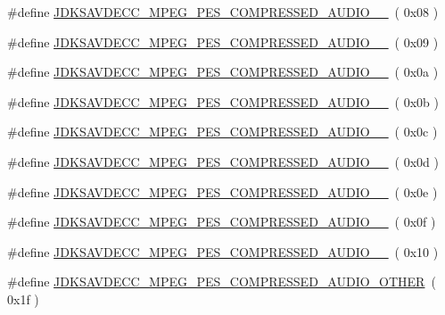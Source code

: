 \begin{DoxyCompactItemize}
\#define \hyperlink{group__mpeg__pes__compressed__audio_ga9ea440a7718daa36283639e4b9ae93af}{J\+D\+K\+S\+A\+V\+D\+E\+C\+C\+\_\+\+M\+P\+E\+G\+\_\+\+P\+E\+S\+\_\+\+C\+O\+M\+P\+R\+E\+S\+S\+E\+D\+\_\+\+A\+U\+D\+I\+O\+\_\+\_}~( 0x08 )
\item 
\#define \hyperlink{group__mpeg__pes__compressed__audio_ga388208460b496b5a3fa43601aa4a8618}{J\+D\+K\+S\+A\+V\+D\+E\+C\+C\+\_\+\+M\+P\+E\+G\+\_\+\+P\+E\+S\+\_\+\+C\+O\+M\+P\+R\+E\+S\+S\+E\+D\+\_\+\+A\+U\+D\+I\+O\+\_\+\_}~( 0x09 )
\item 
\#define \hyperlink{group__mpeg__pes__compressed__audio_gad3820f10b2d8d7f8e5d7dba7554591eb}{J\+D\+K\+S\+A\+V\+D\+E\+C\+C\+\_\+\+M\+P\+E\+G\+\_\+\+P\+E\+S\+\_\+\+C\+O\+M\+P\+R\+E\+S\+S\+E\+D\+\_\+\+A\+U\+D\+I\+O\+\_\+\_}~( 0x0a )
\item 
\#define \hyperlink{group__mpeg__pes__compressed__audio_ga44f00a2f1e250ffd167c1c54ede37b9c}{J\+D\+K\+S\+A\+V\+D\+E\+C\+C\+\_\+\+M\+P\+E\+G\+\_\+\+P\+E\+S\+\_\+\+C\+O\+M\+P\+R\+E\+S\+S\+E\+D\+\_\+\+A\+U\+D\+I\+O\+\_\+\_}~( 0x0b )
\item 
\#define \hyperlink{group__mpeg__pes__compressed__audio_ga2d11fb9ae7325866b482ddae46c01f6c}{J\+D\+K\+S\+A\+V\+D\+E\+C\+C\+\_\+\+M\+P\+E\+G\+\_\+\+P\+E\+S\+\_\+\+C\+O\+M\+P\+R\+E\+S\+S\+E\+D\+\_\+\+A\+U\+D\+I\+O\+\_\+\_}~( 0x0c )
\item 
\#define \hyperlink{group__mpeg__pes__compressed__audio_ga378eb21c914ca30bed9ed15b919e2db7}{J\+D\+K\+S\+A\+V\+D\+E\+C\+C\+\_\+\+M\+P\+E\+G\+\_\+\+P\+E\+S\+\_\+\+C\+O\+M\+P\+R\+E\+S\+S\+E\+D\+\_\+\+A\+U\+D\+I\+O\+\_\+\_}~( 0x0d )
\item 
\#define \hyperlink{group__mpeg__pes__compressed__audio_gad5046aba52c6b517a355dacb11175fd1}{J\+D\+K\+S\+A\+V\+D\+E\+C\+C\+\_\+\+M\+P\+E\+G\+\_\+\+P\+E\+S\+\_\+\+C\+O\+M\+P\+R\+E\+S\+S\+E\+D\+\_\+\+A\+U\+D\+I\+O\+\_\+\_}~( 0x0e )
\item 
\#define \hyperlink{group__mpeg__pes__compressed__audio_ga3921abf02d7310409afc83a537327b02}{J\+D\+K\+S\+A\+V\+D\+E\+C\+C\+\_\+\+M\+P\+E\+G\+\_\+\+P\+E\+S\+\_\+\+C\+O\+M\+P\+R\+E\+S\+S\+E\+D\+\_\+\+A\+U\+D\+I\+O\+\_\+\_}~( 0x0f )
\item 
\#define \hyperlink{group__mpeg__pes__compressed__audio_gaad743851b72299592a03191fd84d149c}{J\+D\+K\+S\+A\+V\+D\+E\+C\+C\+\_\+\+M\+P\+E\+G\+\_\+\+P\+E\+S\+\_\+\+C\+O\+M\+P\+R\+E\+S\+S\+E\+D\+\_\+\+A\+U\+D\+I\+O\+\_\+\_}~( 0x10 )
\item 
\#define \hyperlink{group__mpeg__pes__compressed__audio_ga8c6b9294758992d20a7352fb36c335d2}{J\+D\+K\+S\+A\+V\+D\+E\+C\+C\+\_\+\+M\+P\+E\+G\+\_\+\+P\+E\+S\+\_\+\+C\+O\+M\+P\+R\+E\+S\+S\+E\+D\+\_\+\+A\+U\+D\+I\+O\+\_\+\+O\+T\+H\+ER}~( 0x1f )
\end{DoxyCompactItemize}


